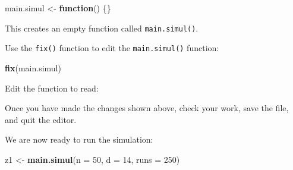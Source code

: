 \documentclass[12pt,a4paper]{book}
\newenvironment{Shaded}{\begin{snugshade}}{\end{snugshade}}
\newcommand{\KeywordTok}[1]{\textcolor[rgb]{0.13,0.29,0.53}{\textbf{#1}}}
\newcommand{\DataTypeTok}[1]{\textcolor[rgb]{0.13,0.29,0.53}{#1}}
\newcommand{\DecValTok}[1]{\textcolor[rgb]{0.00,0.00,0.81}{#1}}
\newcommand{\CharTok}[1]{\textcolor[rgb]{0.31,0.60,0.02}{#1}}
\newcommand{\StringTok}[1]{\textcolor[rgb]{0.31,0.60,0.02}{#1}}
\newcommand{\OtherTok}[1]{\textcolor[rgb]{0.56,0.35,0.01}{#1}}
\newcommand{\ControlFlowTok}[1]{\textcolor[rgb]{0.13,0.29,0.53}{\textbf{#1}}}
\newcommand{\OperatorTok}[1]{\textcolor[rgb]{0.81,0.36,0.00}{\textbf{#1}}}
\newcommand{\NormalTok}[1]{#1}
\theoremstyle{definition}
\theoremstyle{definition}
\theoremstyle{definition}
\theoremstyle{remark}
\begin{document}
\begin{Shaded}
\begin{Highlighting}[]
\NormalTok{main.simul <-}\StringTok{ }\ControlFlowTok{function}\NormalTok{() \{\}}
\end{Highlighting}
\end{Shaded}

This creates an empty function called \texttt{main.simul()}.

Use the \texttt{fix()} function to edit the \texttt{main.simul()}
function:

\begin{Shaded}
\begin{Highlighting}[]
\KeywordTok{fix}\NormalTok{(main.simul)}
\end{Highlighting}
\end{Shaded}

Edit the function to read:

\begin{Shaded}
\end{Shaded}

Once you have made the changes shown above, check your work, save the
file, and quit the editor.

We are now ready to run the simulation:

\begin{Shaded}
\begin{Highlighting}[]
\NormalTok{z1 <-}\StringTok{ }\KeywordTok{main.simul}\NormalTok{(}\DataTypeTok{n =} \DecValTok{50}\NormalTok{, }\DataTypeTok{d =} \DecValTok{14}\NormalTok{, }\DataTypeTok{runs =} \DecValTok{250}\NormalTok{)}
\end{Highlighting}
\end{Shaded}
\end{document}
